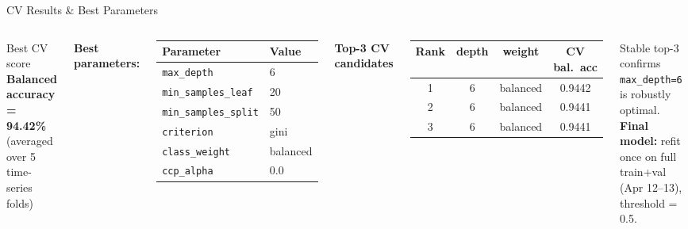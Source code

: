 \documentclass[aspectratio=169,10pt]{beamer}
\newcommand{\code}[1]{\texttt{\small #1}}
\begin{document}
\begin{frame}{CV Results \& Best Parameters}
  \begin{columns}[T]
    \begin{block}{Best CV score}
      \textbf{Balanced accuracy = 94.42\%} \\
      (averaged over 5 time-series folds)
    \end{block}

    \medskip
    \textbf{Best parameters:}
    \begin{center}
    \begin{tabular}{ll}
      \toprule
      Parameter & Value \\
      \midrule
      \code{max\_depth}          & 6 \\
      \code{min\_samples\_leaf}  & 20 \\
      \code{min\_samples\_split} & 50 \\
      \code{criterion}           & gini \\
      \code{class\_weight}       & balanced \\
      \code{ccp\_alpha}          & 0.0 \\
      \bottomrule
    \end{tabular}
    \end{center}

    \textbf{Top-3 CV candidates}
    \begin{center}
    \begin{tabular}{cccc}
      \toprule
      Rank & depth & weight & CV bal.\ acc \\
      \midrule
      1 & 6 & balanced & 0.9442 \\
      2 & 6 & balanced & 0.9441 \\
      3 & 6 & balanced & 0.9441 \\
      \bottomrule
    \end{tabular}
    \end{center}

    \medskip
    Stable top-3 confirms \code{max\_depth=6} is robustly optimal. \\[0.5em]
    \textbf{Final model:} refit once on full train+val (Apr 12–13), threshold = 0.5.
  \end{columns}
\end{frame}
\end{document}
